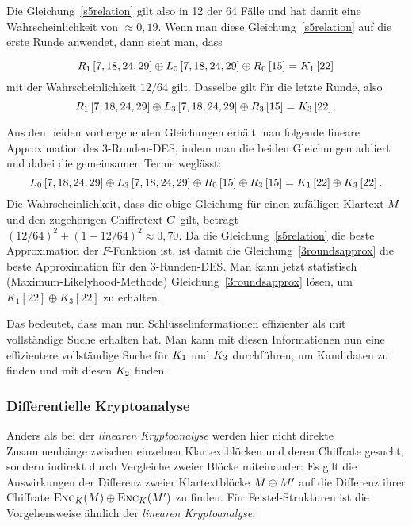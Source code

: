 Die Gleichung~\ref{s5relation} gilt also in 12 der 64 Fälle und hat damit eine Wahrscheinlichkeit von $\approx 0,19$. Wenn man diese Gleichung~\ref{s5relation}
auf die erste Runde anwendet, dann sieht man, dass

\begin{equation}
	R_1\left[ 7,18,24,29\right] \oplus L_0\left[ 7,18,24,29\right] \oplus R_0\left[ 15 \right] = K_1 \left[ 22 \right]
\end{equation}
mit der Wahrscheinlichkeit $12/64$ gilt. Dasselbe gilt für die letzte Runde, also
\begin{equation}
	R_1\left[ 7,18,24,29\right] \oplus L_3\left[ 7,18,24,29\right] \oplus R_3\left[ 15 \right] = K_3 \left[ 22 \right].
\end{equation}

Aus den beiden vorhergehenden Gleichungen erhält man folgende lineare Approximation des 3-Runden-DES, indem man die beiden Gleichungen addiert und dabei die gemeinsamen Terme weglässt:
\begin{equation}
	L_0\left[ 7,18,24,29\right] \oplus L_3\left[ 7,18,24,29\right] \oplus R_0\left[ 15 \right] \oplus R_3\left[ 15 \right] = K_1 \left[ 22 \right] \oplus K_3\left[ 22 \right].
	\label{3roundsapprox}
\end{equation}
Die Wahrscheinlichkeit, dass die obige Gleichung für einen zufälligen Klartext $M$ und den zugehörigen Chiffretext $C$ gilt, beträgt
$(12/64)^2+(1-12/64)^2 \approx 0,70$. Da die Gleichung~\ref{s5relation} die beste Approximation der $F$-Funktion ist, ist damit die
Gleichung~\ref{3roundsapprox} die beste Approximation für den 3-Runden-DES. Man kann jetzt statistisch (Maximum-Likelyhood-Methode)
Gleichung~\ref{3roundsapprox} lösen, um $K_1\left[ 22\right] \oplus K_3\left[ 22\right]$ zu erhalten.

Das bedeutet, dass man nun Schlüsselinformationen effizienter als mit vollständige Suche erhalten hat. Man kann mit diesen Informationen nun eine effizientere vollständige Suche für $K_1$ und $K_3$ durchführen, um Kandidaten zu finden und mit diesen $K_2$ finden.


\subsubsection{Differentielle Kryptoanalyse}
\label{sssec:diffKryptoanalyse}
Anders als bei der \textit{linearen Kryptoanalyse} werden hier nicht direkte Zusammenhänge zwischen einzelnen Klartextblöcken und deren Chiffrate gesucht, sondern indirekt durch Vergleiche zweier Blöcke miteinander: Es gilt die Auswirkungen der Differenz zweier Klartextblöcke $M \oplus M'$ auf die Differenz ihrer Chiffrate $\textsc{Enc}_{K}(M) \oplus \textsc{Enc}_{K}(M')$ zu finden.
Für Feistel-Strukturen ist die Vorgehensweise ähnlich der \textit{linearen Kryptoanalyse}:

